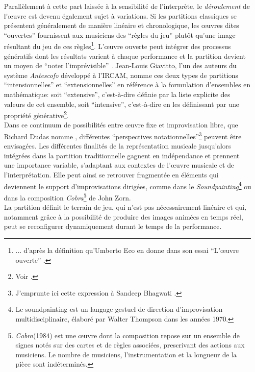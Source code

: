 \noindent Parallèlement à cette part laissée à la sensibilité de l'interprète, le \textit{déroulement} de l'œuvre est devenu également sujet à variations. Si les partitions classiques se présentent généralement de manière linéaire et chronologique, les œuvres dites ``ouvertes'' fournissent aux musiciens des ``règles du jeu'' plutôt qu'une image résultant du jeu de ces règles\footnote{... d'après la définition qu'Umberto Eco en donne dans son essai ``L'œuvre ouverte'' \cite{eco_loeuvre_2015}.}. L'œuvre ouverte peut intégrer des processus génératifs dont les résultats varient à chaque performance et la partition devient un moyen de ``noter l'imprévisible'' \cite{rebelo_notating_2010}. Jean-Louis Giavitto, l'un des auteurs du système \textit{Antescofo} développé à l'\gls{IRCAM}, nomme ces deux types de partitions ``intensionnelles'' et ``extensionnelles'' en référence à la formulation d'ensembles en mathématique: soit ``extensive'', c'est-à-dire définie par la liste explicite des valeurs de cet ensemble, soit ``intensive'', c'est-à-dire en les définissant par une propriété générative\footnote{Voir \cite{giavitto_du_2014}.}.\\
\indent Dans ce continuum de possibilités entre œuvre fixe et improvisation libre, que Richard Dudas nomme  \cite{dudas_comprovisation:_2010}, différentes ``perspectives notationnelles''\footnote{J'emprunte ici cette expression à Sandeep Bhagwati \cite{bhagwati_notational_2013}.} peuvent être envisagées. Les différentes finalités de la représentation musicale jusqu'alors intégrées dans la partition traditionnelle gagnent en indépendance et prennent une importance variable, s'adaptant aux contextes de l'œuvre musicale et de l'interprétation. Elle peut ainsi se retrouver fragmentée en éléments qui deviennent le support d'improvisations dirigées, comme dans le \textit{Soundpainting}\footnote{Le soundpainting est un langage gestuel de direction d'improvisation multidisciplinaire, élaboré par Walter Thompson dans les années 1970.} ou dans la composition \textit{Cobra}\footnote{\textit{Cobra}(1984) est une œuvre dont la composition repose sur un ensemble de signes notés sur des cartes et de règles associées, prescrivant des actions aux musiciens. Le nombre de musiciens, l'instrumentation et la longueur de la pièce sont indéterminés.} de John Zorn.\\
\indent La partition définit le terrain de jeu, qui n'est pas nécessairement linéaire et qui, notamment grâce à la possibilité de produire des images animées en temps réel, peut se reconfigurer dynamiquement durant le temps de la performance.

